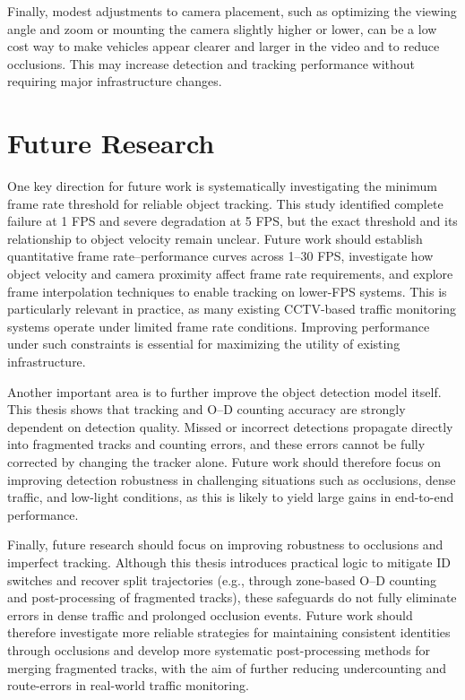 Finally, modest adjustments to camera placement, such as optimizing the viewing angle and zoom or mounting the camera slightly higher or lower, can be a low cost way to make vehicles appear clearer and larger in the video and to reduce occlusions. This may increase detection and tracking performance without requiring major infrastructure changes.

\section{Future Research}
One key direction for future work is systematically investigating the minimum frame rate threshold for reliable object tracking. This study identified complete failure at 1 FPS and severe degradation at 5 FPS, but the exact threshold and its relationship to object velocity remain unclear. Future work should establish quantitative frame rate–performance curves across 1–30 FPS, investigate how object velocity and camera proximity affect frame rate requirements, and explore frame interpolation techniques to enable tracking on lower-FPS systems. This is particularly relevant in practice, as many existing CCTV-based traffic monitoring systems operate under limited frame rate conditions. Improving performance under such constraints is essential for maximizing the utility of existing infrastructure.

Another important area is to further improve the object detection model itself. This thesis shows that tracking and O–D counting accuracy are strongly dependent on detection quality. Missed or incorrect detections propagate directly into fragmented tracks and counting errors, and these errors cannot be fully corrected by changing the tracker alone. Future work should therefore focus on improving detection robustness in challenging situations such as occlusions, dense traffic, and low-light conditions, as this is likely to yield large gains in end-to-end performance.

Finally, future research should focus on improving robustness to occlusions and imperfect tracking. Although this thesis introduces practical logic to mitigate ID switches and recover split trajectories (e.g., through zone-based O–D counting and post-processing of fragmented tracks), these safeguards do not fully eliminate errors in dense traffic and prolonged occlusion events. Future work should therefore investigate more reliable strategies for maintaining consistent identities through occlusions and develop more systematic post-processing methods for merging fragmented tracks, with the aim of further reducing undercounting and route-errors in real-world traffic monitoring.
